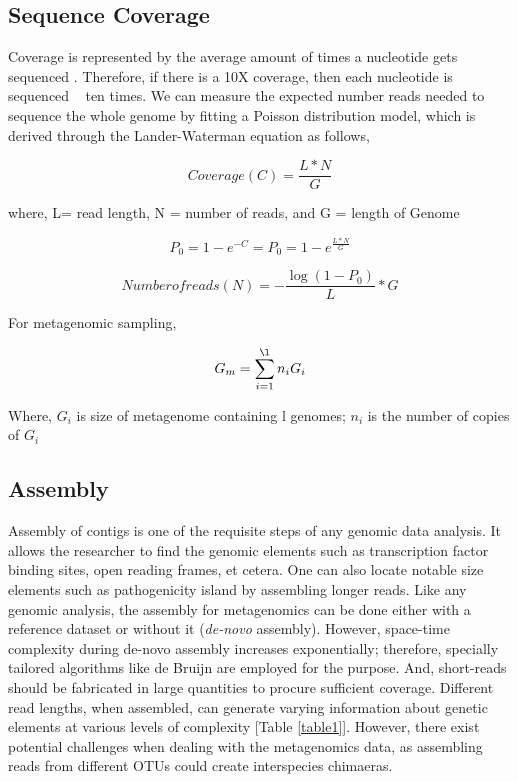 \subsection{Sequence Coverage}
Coverage is represented by the average amount of times a nucleotide gets sequenced \cite{ref1}. Therefore, if there is a 10X coverage, then each nucleotide is sequenced ~ ten times. We can measure the expected number reads needed to sequence the whole genome by fitting a Poisson distribution model, which is derived through the Lander-Waterman equation as follows,

\begin{equation} 
  Coverage (C) = \frac{L * N}{G}
  \label{eq:eq1}
\end{equation}

where, L= read length, N = number of reads, and G = length of Genome

\begin{equation} 
  P_{0} = 1 - e^{-C} = P_{0} = 1 - e^{\frac{L * N}{G}}
  \label{eq:eq2}
\end{equation}

\begin{equation} 
  Number  of reads (N) = -\frac{\log(1-P_{0})}{L}* G
  \label{eq:eq3}
\end{equation}

For metagenomic sampling,

\begin{equation} 
  G_{m} = \sum_{i=1}^{\l} n_{i}G_{i}
  \label{eq:eq4}
\end{equation}

Where, $G_{i}$ is size of metagenome containing l genomes; $n_{i}$ is the number of copies of $G_{i}$

\subsection{Assembly}
Assembly of contigs is one of the requisite steps of any genomic data analysis. It allows the researcher to find the genomic elements such as transcription factor binding sites, open reading frames, et cetera. One can also locate notable size elements such as pathogenicity island by assembling longer reads. Like any genomic analysis, the assembly for metagenomics can be done either with a reference dataset or without it (\emph{de-novo} assembly). However, space-time complexity during de-novo assembly increases exponentially; therefore, specially tailored algorithms like de Bruijn are employed for the purpose. And, short-reads should be fabricated in large quantities to procure sufficient coverage. Different read lengths, when assembled, can generate varying information about genetic elements at various levels of complexity [Table \ref{table1}]\cite{ref1}. However, there exist potential challenges when dealing with the metagenomics data, as assembling reads from different OTUs could create interspecies chimaeras.


